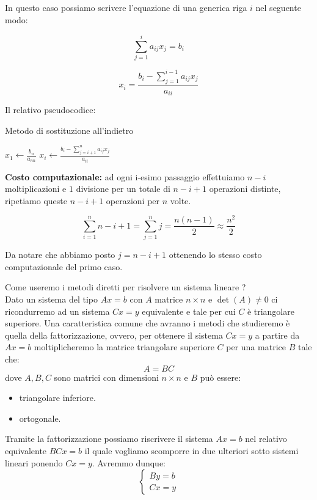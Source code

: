 \documentclass[12pt, a4paper]{book}
\theoremstyle{definition}
\begin{document}
\begin{flushleft}
\begin{enumerate}
In questo caso possiamo scrivere l'equazione di una generica riga $i$ nel seguente modo:

\[
		\sum_{j = 1} ^ {i} a_{ij}x_{j} = b_{i}
\]	

\[
		x_{i} = \frac{ b_{i} - \sum_{j = 1} ^ {i-1} a_{ij}x_{j}}{a_{ii}}
\]	


Il relativo pseudocodice: 

\begin{algorithm}
		\caption{ Metodo di sostituzione all'indietro}
		\begin{algorithmic} 
			\STATE $ x_{1} \leftarrow  \frac{b_{n}}{a_{nn}}$
				\STATE $ x_{i} \leftarrow  \frac{ b_{i} - \sum_{j = i+1} ^ {n} a_{ij}x_{j}}{a_{ii}} $
			\ENDFOR
		\end{algorithmic}
\end{algorithm}	
\vspace{1em}
\textbf{Costo computazionale:} ad ogni i-esimo passaggio effettuiamo $n-i$ moltiplicazioni e $1$ divisione per un totale di $n-i+1$ operazioni distinte,  ripetiamo queste $n-i+1$ operazioni per $n$ volte. 

\[
	\sum_{i = 1}^{n} n-i+1 = \sum_{j= 1}^{n} j =  \frac{n(n-1)}{2} \approx \frac{n^{2}}{2}
\]

Da notare che abbiamo posto $j = n-i+1$ ottenendo lo stesso costo computazionale del primo caso.
\end{enumerate}

Come useremo i metodi diretti per risolvere un sistema lineare ?\\
Dato un sistema del tipo $Ax = b$ con $A$ matrice $n \times n $ e $\det(A) \neq 0$ ci ricondurremo ad un sistema $Cx = y$ equivalente e tale per cui $C$ è triangolare superiore.
Una caratteristica comune che avranno i metodi che studieremo è quella della fattorizzazione, ovvero,  per ottenere il sistema  $Cx = y$ a partire da  $Ax = b$  moltiplicheremo la matrice triangolare superiore $C$ per una matrice $B$ tale che: 
\[ 
	A = BC
\]
dove $A,B,C$ sono matrici con dimensioni $n \times n$ e $B$ può essere:
\begin{itemize}
	\item triangolare inferiore.
	\item ortogonale.
\end{itemize}

Tramite la fattorizzazione possiamo riscrivere il sistema $Ax = b$ nel relativo equivalente $BCx = b$ il quale vogliamo scomporre in due ulteriori sotto sistemi lineari  ponendo $Cx = y$. Avremmo dunque:
\[ 
		\begin{cases}
				By = b\\
				Cx = y
		\end{cases}	
\]


\end{flushleft}
\end{document}
